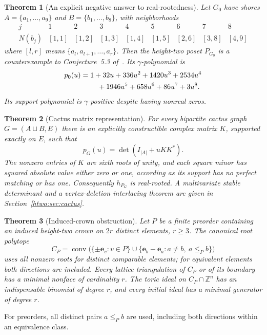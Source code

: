 \documentclass[11pt]{article}
\numberwithin{equation}{section}
\newtheorem{theorem}{Theorem}[section]
\theoremstyle{definition}
\newcommand{\Z}{\mathbb Z}
\newcommand{\conv}{\operatorname{conv}}
\newcommand{\ee}{\mathbf e}
\begin{document}
\begin{theorem}[An explicit negative answer to real-rootedness]\label{htwo:thm:counter}
Let $G_0$ have shores $A=\{a_1,\ldots,a_9\}$ and
$B=\{b_1,\ldots,b_8\}$, with neighborhoods
\begin{equation}
\begin{array}{c|cccccccc}
 j&1&2&3&4&5&6&7&8\\\hline
 N(b_j)&[1,1]&[1,2]&[1,3]&[1,4]&[1,5]&[2,6]&[3,8]&[4,9]
\end{array}\label{htwo:eq:board}
\end{equation}
where $[l,r]$ means $\{a_l,a_{l+1},\ldots,a_r\}$.
Then the height-two poset $P_{G_0}$ is a counterexample to
Conjecture~5.3 of~\cite{AC}. Its $\gamma$-polynomial is
\begin{align}
 p_0(u)={}&1+32u+336u^2+1420u^3+2534u^4\notag\\
         &\quad+1946u^5+658u^6+86u^7+3u^8.\label{htwo:eq:p0}
\end{align}
Its support polynomial is $\gamma$-positive despite having nonreal zeros.
\end{theorem}

\begin{theorem}[Cactus matrix representation]\label{htwo:thm:cactusintro}
For every bipartite cactus graph $G=(A\sqcup B,E)$ there is an explicitly
constructible complex matrix $K$, supported exactly on $E$, such that
\begin{equation}
 p_G(u)=\det(I_{|A|}+uKK^*).\label{htwo:eq:detintro}
\end{equation}
The nonzero entries of $K$ are sixth roots of unity, and each square minor
has squared absolute value either zero or one, according as its support
has no perfect matching or has one. Consequently $h_{P_G}$ is real-rooted.
A multivariate stable determinant and a vertex-deletion interlacing theorem
are given in Section~\ref{htwo:sec:cactus}.
\end{theorem}

\begin{theorem}[Induced-crown obstruction]\label{htwo:thm:crownintro}
Let $P$ be a finite preorder containing an induced height-two crown on
$2r$ distinct elements, $r\ge3$. The canonical root polytope
\[
 C_P=\conv\bigl(\{\pm\ee_v:v\in P\}\cup
        \{\ee_b-\ee_a:a\ne b,\ a\le_P b\}\bigr)
\]
uses all nonzero roots for distinct comparable elements; for equivalent
elements both directions are included. Every lattice triangulation of
$C_P$ or of its boundary has a minimal nonface of cardinality $r$.
The toric ideal on $C_P\cap\Z^n$ has an indispensable binomial of degree
$r$, and every initial ideal has a minimal generator of degree $r$.
\end{theorem}
For preorders, all distinct pairs $a\le_P b$ are used, including both
directions within an equivalence class.
\end{document}

